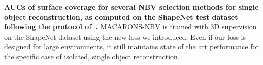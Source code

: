 \begin{table}
{{  }
  }
  \caption{{\bf AUCs of surface coverage for several NBV selection methods for single object reconstruction, as computed on the ShapeNet test dataset following the protocol of~\cite{zeng-icirs20-pcnbv,guedon-nips22-scone-surface-coverage}.} MACARONS-NBV is trained with 3D supervision on the ShapeNet dataset using the new loss we introduced. Even if our loss is designed for large environments, it still maintains state of the art performance for the specific case of isolated, single object reconstruction.}
  \label{tab:coverage_auc_shapenet}
\end{table}
